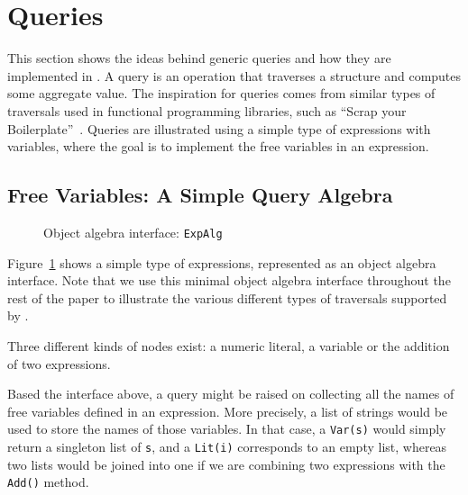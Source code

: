 \section{Queries}\label{sec:queries}

This section shows the ideas behind generic queries and how they are
implemented in \Name. A query is an operation that traverses a
structure and computes some aggregate value. The inspiration for
queries comes from similar types of traversals used in functional
programming libraries, such as ``Scrap your Boilerplate''~\cite{ralf03syb}.
Queries are illustrated using a simple type of expressions with
variables, where the goal is to implement the free variables in an expression.

\begin{comment}
As a specific type of object algebras, queries allow users to define
new operations handling a user-defined data structure\bruno{This
  definition of queries is just too broad. Please
look at papers like Syb to see how they describe queries and transformations}. A \textit{query
  algebra} is a class implementing an object algebra interface by a
top-down traversal throughout the hierarchy. It is something
supporting the program to gather information from the substructures of
a data type recursively, and make a response at the root node to the
query.
\end{comment}

\subsection{Free Variables: A Simple Query Algebra}\label{subsec:freevars}

\begin{figure}[!htbp]
\vspace{-.1in}
\caption{Object algebra interface: \lstinline{ExpAlg}}
\label{exp_alg}
\end{figure}

Figure~\ref{exp_alg} shows a simple type of expressions, represented 
as an object algebra interface. Note that we use this minimal object
algebra interface throughout the rest of the paper to illustrate the various different
types of traversals supported by \Name. 

Three different kinds of nodes exist:
a numeric literal, a variable or the addition of
two expressions. 

Based the interface above, a query might be raised on collecting
all the names of free variables defined in an expression. More
precisely, a list of strings would be used to store the names of
those variables. In that case, a \lstinline{Var(s)} would simply return a singleton list of \lstinline{s}, and a \lstinline{Lit(i)} corresponds to an empty list, whereas two lists would be joined into one if we are combining two
expressions with the \lstinline{Add()} method.

